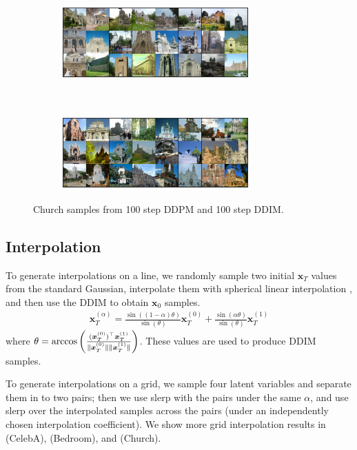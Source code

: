 \begin{figure}
    \centering
    \begin{subfigure}{\textwidth}
    \centering
    \includegraphics[width=0.8\textwidth]{figures/church-samples-uniform-100-ddpm.pdf}
    \end{subfigure}
    ~
    \begin{subfigure}{\textwidth}
    \centering
    \includegraphics[width=0.8\textwidth]{figures/church-samples-uniform-100-ddim.pdf}
    \end{subfigure}
    \caption{Church samples from 100 step DDPM and 100 step DDIM.}
    \label{fig:church-samples}
\end{figure}



\subsection{Interpolation}
\label{app:interpolation}
To generate interpolations on a line, we randomly sample two initial $\bm{x}_T$ values from the standard Gaussian, interpolate them with spherical linear interpolation \citep{shoemake1985animating}, and then use the DDIM to obtain $\bm{x}_0$ samples.
\begin{align}
    \bm{x}_T^{(\alpha)} =  \frac{\sin((1 - \alpha) \theta)}{\sin(\theta)} \bm{x}_{T}^{(0)} + \frac{\sin(\alpha \theta)}{\sin(\theta)} \bm{x}_{T}^{(1)}
\end{align}
where $\theta = \arccos\left(\frac{(\bm{x}_T^{(0)})^\top \bm{x}_T^{(1)}}{{\lVert {\bm{x}_T^{(0)}} \rVert} {\lVert {\bm{x}_T^{(1)}} \rVert}}\right)$. These values are used to produce DDIM samples.

To generate interpolations on a grid, we sample four latent variables and separate them in to two pairs; then we use slerp with the pairs under the same $\alpha$, and use slerp over the interpolated samples across the pairs (under an independently chosen interpolation coefficient). We show more grid interpolation results in  (CelebA),  (Bedroom), and  (Church).

